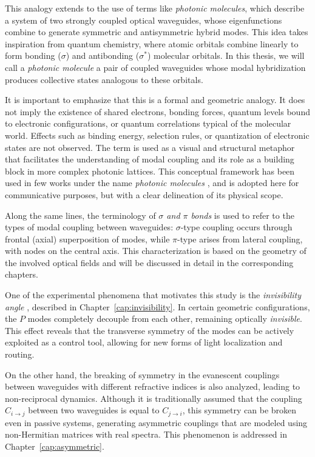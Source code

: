 This analogy extends to the use of terms like \textit{photonic molecules}, which describe a system of two strongly coupled optical waveguides, whose eigenfunctions combine to generate symmetric and antisymmetric hybrid modes. This idea takes inspiration from quantum chemistry, where atomic orbitals combine linearly to form bonding ($\sigma$) and antibonding ($\sigma^*$) molecular orbitals. In this thesis, we will call a \textit{photonic molecule} a pair of coupled waveguides whose modal hybridization produces collective states analogous to these orbitals.

It is important to emphasize that this is a formal and geometric analogy. It does not imply the existence of shared electrons, bonding forces, quantum levels bound to electronic configurations, or quantum correlations typical of the molecular world. Effects such as binding energy, selection rules, or quantization of electronic states are not observed. The term is used as a visual and structural metaphor that facilitates the understanding of modal coupling and its role as a building block in more complex photonic lattices. This conceptual framework has been used in few works under the name \textit{photonic molecules} \citep{molecules}, and is adopted here for communicative purposes, but with a clear delineation of its physical scope.

Along the same lines, the terminology of \textit{$\sigma$ and $\pi$ bonds} is used to refer to the types of modal coupling between waveguides: $\sigma$-type coupling occurs through frontal (axial) superposition of modes, while $\pi$-type arises from lateral coupling, with nodes on the central axis. This characterization is based on the geometry of the involved optical fields and will be discussed in detail in the corresponding chapters.

One of the experimental phenomena that motivates this study is the \textit{invisibility angle} \cite{Pmodecoupling}, described in Chapter~\ref{cap:invisibility}. In certain geometric configurations, the $P$ modes completely decouple from each other, remaining optically \textit{invisible}. This effect reveals that the transverse symmetry of the modes can be actively exploited as a control tool, allowing for new forms of light localization and routing.

On the other hand, the breaking of symmetry in the evanescent couplings between waveguides with different refractive indices is also analyzed, leading to non-reciprocal dynamics. Although it is traditionally assumed that the coupling $C_{i\to j}$ between two waveguides is equal to $C_{j\to i}$, this symmetry can be broken even in passive systems, generating asymmetric couplings that are modeled using non-Hermitian matrices with real spectra. This phenomenon is addressed in Chapter~\ref{cap:asymmetric}.

